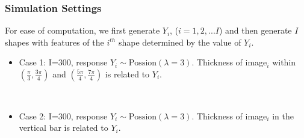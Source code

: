 \documentclass[9 pt]{beamer}
\newcommand{\bi}{\begin{itemize}}
\newcommand{\ei}{\end{itemize}}
\begin{document}
\begin{frame}
\frametitle{Simulation Settings}

For ease of computation, we first generate $Y_i$, ($i=1,2,...I$) and then generate $I$ shapes with features of the $i^{th}$ shape determined by the value of $Y_i$.

\bi
\item Case 1: I=300, response $Y_i\sim \text{Possion}(\lambda=3)$. Thickness of image$_i$ within $(\frac{\pi}{3},\frac{3\pi}{4})$ and $(\frac{5\pi}{4},\frac{7\pi}{4})$ is related to $Y_i$.
\begin{figure}[!th]
\centering
{}
\end{figure}\

\item Case 2: I=300, response $Y_i\sim \text{Possion}(\lambda=3)$. Thickness of image$_i$ in the vertical bar is related to $Y_i$.
\begin{figure}[!th]
\centering
{}
\end{figure}
\ei
\end{frame}
\end{document}
